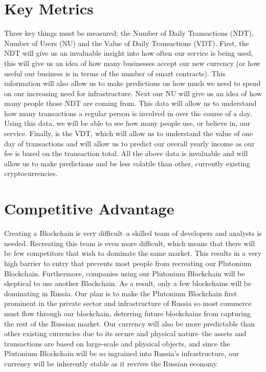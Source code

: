 \documentclass[12pt]{article}
\begin{document}
\section{Key Metrics}
Three key things must be measured; the Number of Daily Transactions (NDT), Number of
Users (NU) and the Value of Daily Transactions (VDT). First, the NDT will give us an
invaluable insight into how often our service is being used, this will give us an idea of how
many businesses accept our new currency (or how useful our business is in terms of the
number of smart contracts). This information will also allow us to make predictions on how
much we need to spend on our increasing need for infrastructure. Next our NU will give us
an idea of how many people those NDT are coming from. This data will allow us to
understand how many transactions a regular person is involved in over the course of a day.
Using this data, we will be able to see how many people use, or believe in, our service.
Finally, is the VDT, which will allow us to understand the value of one day of transactions
and will allow us to predict our overall yearly income as our fee is based on the transaction
total. All the above data is invaluable and will allow us to make predictions and be less
volatile than other, currently existing cryptocurrencies. 
\pagebreak
\section{Competitive Advantage}
Creating a Blockchain is very difficult--a skilled team of developers and analysts is needed. Recreating this team is even more difficult, which means that there will be few competitors that wish to dominate the same market. This results in a very high barrier to entry that prevents most people from recreating our Plutonium Blockchain. Furthermore, companies using our Plutonium Blockchain will be skeptical to use another Blockchain. As a result, only a few blockchains will be dominating in Russia. Our plan is to make the Plutonium Blockchain first prominent in the private sector and infrastructure of Russia so most commerce must flow through our blockchain, deterring future blockchains from capturing the rest of the Russian market. Our currency will also be more predictable than other existing currencies due to its secure and physical nature--the assets and transactions are based on large-scale and physical objects, and since the Plutonium Blockchain will be so ingrained into Russia's infrastructure, our currency will be inherently stable as it revives the Russian economy.
\pagebreak
\end{document}

